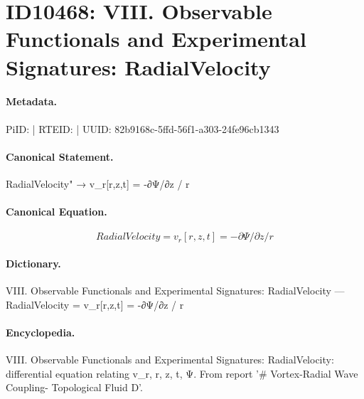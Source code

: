 \section*{ID10468: VIII. Observable Functionals and Experimental Signatures: RadialVelocity}
\paragraph{Metadata.}
PiID:  | RTEID:  | UUID: 82b9168c-5ffd-56f1-a303-24fe96cb1343

\paragraph{Canonical Statement.}
RadialVelocity" → v\_r[r,z,t] = -∂Ψ/∂z / r

\paragraph{Canonical Equation.}
\[
RadialVelocity = v_r[r,z,t] = -∂Ψ/∂z / r
\]

\paragraph{Dictionary.}
VIII. Observable Functionals and Experimental Signatures: RadialVelocity — RadialVelocity = v\_r[r,z,t] = -∂Ψ/∂z / r

\paragraph{Encyclopedia.}
VIII. Observable Functionals and Experimental Signatures: RadialVelocity: differential equation relating v\_r, r, z, t, Ψ. From report '\# Vortex-Radial Wave Coupling- Topological Fluid D'.

